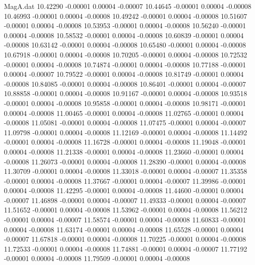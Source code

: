 \begin{filecontents}{MagA.dat}
  10.42290   -0.00001    0.00004   -0.00007
  10.44645   -0.00001    0.00004   -0.00008
  10.46993   -0.00001    0.00004   -0.00008
  10.49242   -0.00001    0.00004   -0.00008
  10.51607   -0.00001    0.00004   -0.00008
  10.53953   -0.00001    0.00004   -0.00008
  10.56240   -0.00001    0.00004   -0.00008
  10.58532   -0.00001    0.00004   -0.00008
  10.60839   -0.00001    0.00004   -0.00008
  10.63142   -0.00001    0.00004   -0.00008
  10.65480   -0.00001    0.00004   -0.00008
  10.67918   -0.00001    0.00004   -0.00008
  10.70205   -0.00001    0.00004   -0.00008
  10.72532   -0.00001    0.00004   -0.00008
  10.74874   -0.00001    0.00004   -0.00008
  10.77188   -0.00001    0.00004   -0.00007
  10.79522   -0.00001    0.00004   -0.00008
  10.81749   -0.00001    0.00004   -0.00008
  10.84085   -0.00001    0.00004   -0.00008
  10.86401   -0.00001    0.00004   -0.00007
  10.88858   -0.00001    0.00004   -0.00008
  10.91167   -0.00001    0.00004   -0.00008
  10.93518   -0.00001    0.00004   -0.00008
  10.95858   -0.00001    0.00004   -0.00008
  10.98171   -0.00001    0.00004   -0.00008
  11.00465   -0.00001    0.00004   -0.00008
  11.02765   -0.00001    0.00004   -0.00008
  11.05081   -0.00001    0.00004   -0.00008
  11.07475   -0.00001    0.00004   -0.00007
  11.09798   -0.00001    0.00004   -0.00008
  11.12169   -0.00001    0.00004   -0.00008
  11.14492   -0.00001    0.00004   -0.00008
  11.16728   -0.00001    0.00004   -0.00008
  11.19048   -0.00001    0.00004   -0.00008
  11.21338   -0.00001    0.00004   -0.00008
  11.23660   -0.00001    0.00004   -0.00008
  11.26073   -0.00001    0.00004   -0.00008
  11.28390   -0.00001    0.00004   -0.00008
  11.30709   -0.00001    0.00004   -0.00008
  11.33018   -0.00001    0.00004   -0.00007
  11.35358   -0.00001    0.00004   -0.00008
  11.37667   -0.00001    0.00004   -0.00007
  11.39986   -0.00001    0.00004   -0.00008
  11.42295   -0.00001    0.00004   -0.00008
  11.44600   -0.00001    0.00004   -0.00007
  11.46898   -0.00001    0.00004   -0.00007
  11.49333   -0.00001    0.00004   -0.00007
  11.51652   -0.00001    0.00004   -0.00008
  11.53962   -0.00001    0.00004   -0.00008
  11.56212   -0.00001    0.00004   -0.00007
  11.58574   -0.00001    0.00004   -0.00008
  11.60833   -0.00001    0.00004   -0.00008
  11.63174   -0.00001    0.00004   -0.00008
  11.65528   -0.00001    0.00004   -0.00007
  11.67818   -0.00001    0.00004   -0.00008
  11.70225   -0.00001    0.00004   -0.00008
  11.72533   -0.00001    0.00004   -0.00008
  11.74881   -0.00001    0.00004   -0.00007
  11.77192   -0.00001    0.00004   -0.00008
  11.79509   -0.00001    0.00004   -0.00008

\end{filecontents}

